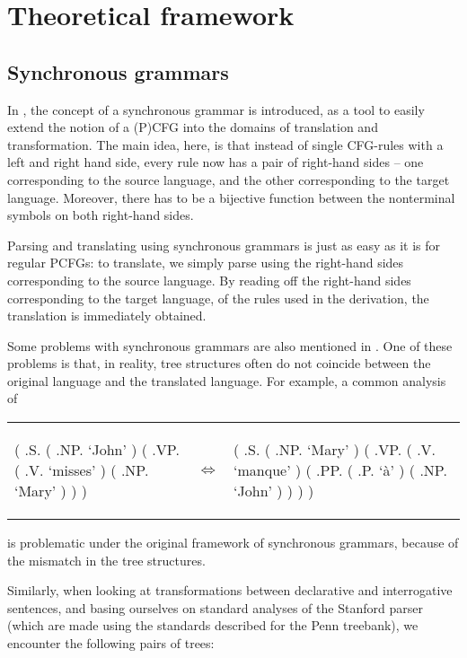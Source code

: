 \documentclass[a4paper]{article}
\theoremstyle{definition}
\begin{document}
\section{Theoretical framework}

\subsection{Synchronous grammars}

In \cite{Ch}, the concept of a synchronous grammar is introduced, as a tool to easily extend the notion of a (P)CFG into the domains of translation and transformation. The main idea, here, is that instead of single CFG-rules with a left and right hand side, every rule now has a pair of right-hand sides -- one corresponding to the source language, and the other corresponding to the target language. Moreover, there has to be a bijective function between the nonterminal symbols on both right-hand sides.

Parsing and translating using synchronous grammars is just as easy as it is for regular PCFGs: to translate, we simply parse using the right-hand sides corresponding to the source language. By reading off the right-hand sides corresponding to the target language, of the rules used in the derivation, the translation is immediately obtained.

Some problems with synchronous grammars are also mentioned in \cite{Ch}. One of these problems is that, in reality, tree structures often do not coincide between the original language and the translated language. For example, a common analysis of 

\begin{tabular}{lll}
\begin{parsetree}
( .S.
	( .NP. `John' )
	( .VP.
		( .V. `misses' )
		( .NP. `Mary' )
	)
)
\end{parsetree}
& $\iff$ &
\begin{parsetree}
( .S.
	( .NP. `Mary' )
	( .VP.
		( .V. `manque' )
		( .PP.
			( .P. `à' )
			( .NP. `John' )
		)
	)
)
\end{parsetree}
\end{tabular}

is problematic under the original framework of synchronous grammars, because of the mismatch in the tree structures.

Similarly, when looking at transformations between declarative and interrogative sentences, and basing ourselves on standard analyses of the Stanford parser (which are made using the standards described for the Penn treebank), we encounter the following pairs of trees:
\end{document}
